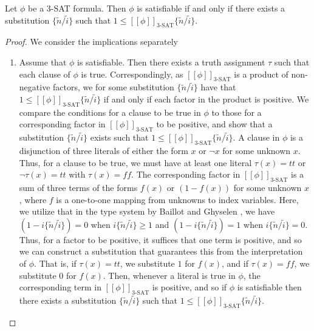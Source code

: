 \begin{lemma}\label{lemma:soundtranslation}
Let $\phi$ be a 3-SAT formula. Then $\phi$ is satisfiable if and only if there exists a substitution $\{\widetilde{n}/\widetilde{i}\}$ such that $1\leq [\![\phi]\!]_{\text{3-SAT}}\{\widetilde{n}/\widetilde{i}\}$.
\begin{proof}
We consider the implications separately
\begin{enumerate}
    \item Assume that $\phi$ is satisfiable. Then there exists a truth assignment $\tau$ such that each clause of $\phi$ is true. Correspondingly, as $[\![\phi]\!]_{\text{3-SAT}}$ is a product of non-negative factors, we for some substitution $\{\widetilde{n}/\widetilde{i}\}$ have that $1 \leq [\![\phi]\!]_{\text{3-SAT}}\{\widetilde{n}/\widetilde{i}\}$ if and only if each factor in the product is positive. We compare the conditions for a clause to be true in $\phi$ to those for a corresponding factor in $[\![\phi]\!]_{\text{3-SAT}}$ to be positive, and show that a substitution $\{\widetilde{n}/\widetilde{i}\}$ exists such that $1 \leq [\![\phi]\!]_{\text{3-SAT}}\{\widetilde{n}/\widetilde{i}\}$. A clause in $\phi$ is a disjunction of three literals of either the form $x$ or $\neg x$ for some unknown $x$. Thus, for a clause to be true, we must have at least one literal $\tau(x) = tt$ or $\neg \tau(x) = tt$ with $\tau(x) = f\!f$. The corresponding factor in $[\![\phi]\!]_{\text{3-SAT}}$ is a sum of three terms of the forms $f(x)$ or $(1 - f(x))$ for some unknown $x$, where $f$ is a one-to-one mapping from unknowns to index variables. Here, we utilize that in the type system by Baillot and Ghyselen \cite{BaillotGhyselen2021}, we have $(1 - i\{\widetilde{n}/\widetilde{i}\}) = 0$ when $i\{\widetilde{n}/\widetilde{i}\} \geq 1$ and $(1 - i\{\widetilde{n}/\widetilde{i}\}) = 1$ when $i\{\widetilde{n}/\widetilde{i}\} = 0$. Thus, for a factor to be positive, it suffices that one term is positive, and so we can construct a substitution that guarantees this from the interpretation of $\phi$. That is, if $\tau(x) = tt$, we substitute $1$ for $f(x)$, and if $\tau(x) = f\!f$, we substitute 0 for $f(x)$. Then, whenever a literal is true in $\phi$, the corresponding term in $[\![\phi]\!]_{\text{3-SAT}}$ is positive, and so if $\phi$ is satisfiable then there exists a substitution $\{\widetilde{n}/\widetilde{i}\}$ such that $1 \leq [\![\phi]\!]_{\text{3-SAT}}\{\widetilde{n}/\widetilde{i}\}$.
     

\end{enumerate}
\end{proof}
\end{lemma}
